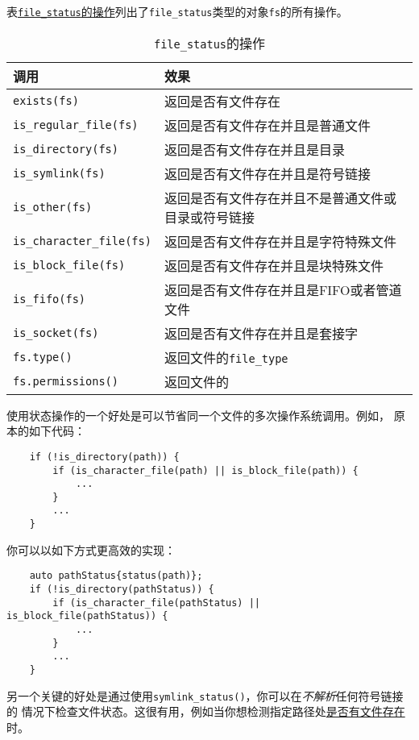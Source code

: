表\hyperref[t20.13]{\texttt{file\_status}的操作}列出了\texttt{file\_status}类型的对象\texttt{fs}的所有操作。
\begin{table}[ht]
    \centering
    \begin{tabular}{l|l}
        \hline
        \textbf{调用}                      & \textbf{效果}               \\
        \hline
        \texttt{exists(fs)}              & 返回是否有文件存在                 \\
        \texttt{is\_regular\_file(fs)}   & 返回是否有文件存在并且是普通文件          \\
        \texttt{is\_directory(fs)}       & 返回是否有文件存在并且是目录            \\
        \texttt{is\_symlink(fs)}         & 返回是否有文件存在并且是符号链接          \\
        \texttt{is\_other(fs)}           & 返回是否有文件存在并且不是普通文件或目录或符号链接 \\
        \texttt{is\_character\_file(fs)} & 返回是否有文件存在并且是字符特殊文件        \\
        \texttt{is\_block\_file(fs)}     & 返回是否有文件存在并且是块特殊文件         \\
        \texttt{is\_fifo(fs)}            & 返回是否有文件存在并且是FIFO或者管道文件    \\
        \texttt{is\_socket(fs)}          & 返回是否有文件存在并且是套接字           \\
        \texttt{fs.type()}               & 返回文件的\texttt{file\_type}  \\
        \texttt{fs.permissions()}        & 返回文件的\nameref{ch20.4.3}   \\
        \hline
    \end{tabular}
    \caption{\texttt{file\_status}的操作}
    \label{t20.13}
\end{table}

使用状态操作的一个好处是可以节省同一个文件的多次操作系统调用。例如，
原本的如下代码：
\begin{lstlisting}
    if (!is_directory(path)) {
        if (is_character_file(path) || is_block_file(path)) {
            ...
        }
        ...
    }
\end{lstlisting}
你可以以如下方式更高效的实现：
\begin{lstlisting}
    auto pathStatus{status(path)};
    if (!is_directory(pathStatus)) {
        if (is_character_file(pathStatus) || is_block_file(pathStatus)) {
            ...
        }
        ...
    }
\end{lstlisting}
另一个关键的好处是通过使用\texttt{symlink\_status()}，你可以在\emph{不解析}任何符号链接的
情况下检查文件状态。这很有用，例如当你想检测指定路径处\hyperref[ch20.4.1.1]{是否有文件存在}时。

